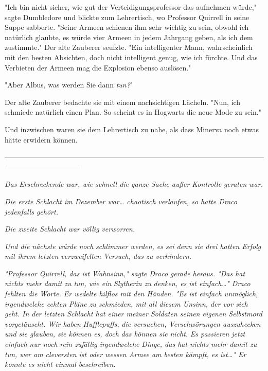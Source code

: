 {"Ich bin nicht sicher, wie gut der Verteidigungsprofessor das aufnehmen würde," sagte Dumbledore und blickte zum Lehrertisch, wo Professor Quirrell in seine Suppe sabberte. "Seine Armeen schienen ihm sehr wichtig zu sein, obwohl ich natürlich glaubte, es würde vier Armeen in jedem Jahrgang geben, als ich dem zustimmte." Der alte Zauberer seufzte. "Ein intelligenter Mann, wahrscheinlich mit den besten Absichten, doch nicht intelligent genug, wie ich fürchte. Und das Verbieten der Armeen mag die Explosion ebenso auslösen."

"Aber Albus, was werden Sie dann \emph{tun?}"

Der alte Zauberer bedachte sie mit einem nachsichtigen Lächeln. "Nun, ich schmiede natürlich einen Plan. So scheint es in Hogwarts die neue Mode zu sein."

Und inzwischen waren sie dem Lehrertisch zu nahe, als dass Minerva noch etwas hätte erwidern können.

--------------------------------------------------------------------------------------------------------------------------------------------

\emph{Das} \emph{Erschreckende war, wie schnell die ganze Sache außer Kontrolle geraten war.}

\emph{Die erste Schlacht im Dezember war… chaotisch} \emph{verlaufen, so hatte Draco jedenfalls gehört.}

\emph{Die zweite Schlacht war völlig} \emph{\emph{ver}\emph{worren}\emph{.}}

\emph{Und die nächste würde noch} \emph{\emph{schlimmer}} \emph{werden, es sei denn sie drei hatten Erfolg mit ihrem letzten verzweifelten Versuch, das zu verhindern.}

\emph{"Professor Quirrell, das ist Wahnsinn," sagte Draco} \emph{gerade heraus. "Das hat nichts mehr} \emph{damit} \emph{zu tun, wie ein} \emph{Slytherin zu} \emph{denken, es ist einfach…" Draco fehlten die Worte. Er wedelte hilflos mit den Händen. "Es ist einfach unmöglich, irgendwelche echten Pläne zu schmieden, mit all diesem Unsinn, der vor sich geht. In der letzten Schlacht hat einer meiner Soldaten seinen eigenen Selbstmord vorgetäuscht. Wir haben} \emph{\emph{Hufflepuffs,}} \emph{die versuchen, Verschwörungen auszuhecken und sie glauben, sie können es, doch} \emph{das können sie} \emph{\emph{nicht.}} \emph{Es passieren jetzt einfach} \emph{nur noch} \emph{rein zufällig irgendwelche} \emph{Dinge, das hat nichts mehr damit zu tun, wer am cleversten ist oder wessen Armee am besten kämpft, es ist…" Er konnte es nicht einmal beschreiben.}

}
